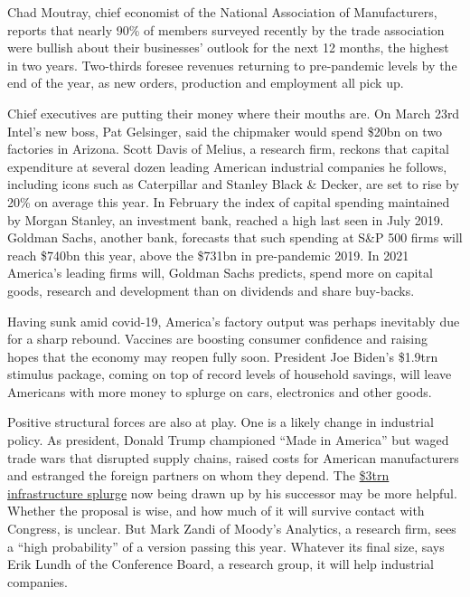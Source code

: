 \documentclass{article}
\begin{document}
Chad Moutray, chief economist of the National Association of Manufacturers, reports that nearly 90\% of members surveyed recently by the trade association were bullish about their businesses' outlook for the next 12 months, the highest in two years. Two-thirds foresee revenues returning to pre-pandemic levels by the end of the year, as new orders, production and employment all pick up. 

Chief executives are putting their money where their mouths are. On March 23rd Intel's new boss, Pat Gelsinger, said the chipmaker would spend \$20bn on two factories in Arizona. Scott Davis of Melius, a research firm, reckons that capital expenditure at several dozen leading American industrial companies he follows, including icons such as Caterpillar and Stanley Black \& Decker, are set to rise by 20\% on average this year. In February the index of capital spending maintained by Morgan Stanley, an investment bank, reached a high last seen in July 2019. Goldman Sachs, another bank, forecasts that such spending at S\&P 500 firms will reach \$740bn this year, above the \$731bn in pre-pandemic 2019. In 2021 America's leading firms will, Goldman Sachs predicts, spend more on capital goods, research and development than on dividends and share buy-backs. 

Having sunk amid covid-19, America's factory output was perhaps inevitably due for a sharp rebound. Vaccines are boosting consumer confidence and raising hopes that the economy may reopen fully soon. President Joe Biden's \$1.9trn stimulus package, coming on top of record levels of household savings, will leave Americans with more money to splurge on cars, electronics and other goods. 

Positive structural forces are also at play. One is a likely change in industrial policy. As president, Donald Trump championed ``Made in America'' but waged trade wars that disrupted supply chains, raised costs for American manufacturers and estranged the foreign partners on whom they depend. The \href{/finance-and-economics/2021/03/25/just-how-anchored-are-americas-inflation-expectations}{\$3trn infrastructure splurge} now being drawn up by his successor may be more helpful. Whether the proposal is wise, and how much of it will survive contact with Congress, is unclear. But Mark Zandi of Moody's Analytics, a research firm, sees a ``high probability'' of a version passing this year. Whatever its final size, says Erik Lundh of the Conference Board, a research group, it will help industrial companies. 
\end{document}
